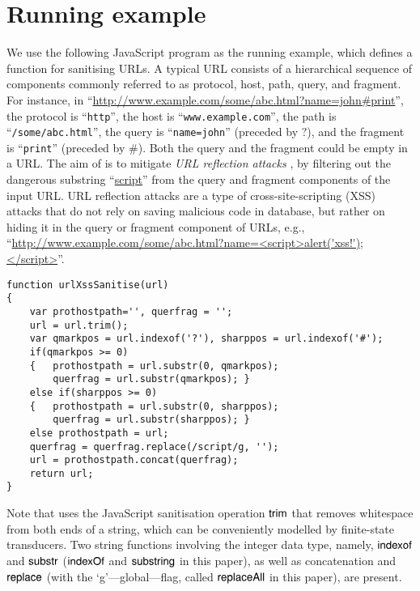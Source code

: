  
\section{Running example} \label{exmp:running}
We use the following JavaScript program as the running example,
which defines a function {\urlxsssanitise} for sanitising URLs. A typical URL consists of a hierarchical sequence of components commonly referred to as protocol, host, path, query, and fragment. For instance, in ``\url{http://www.example.com/some/abc.html?name=john#print}'', the protocol is ``{\tt http}'', the host is ``{\tt www.example.com}'', the path is ``{\tt /some/abc.html}'', the query is ``{\tt name=john}'' (preceded by $?$), and the fragment is ``{\tt print}'' (preceded by $\#$). Both the query and the fragment could be empty in a URL. The aim of {\urlxsssanitise} is to mitigate \emph{URL reflection attacks} \cite{url-reflect}, by filtering out the dangerous substring ``\url{script}'' from the query and fragment components of  the input URL. URL reflection attacks are a type of cross-site-scripting (XSS) attacks that do not rely on saving malicious code in database, but rather on hiding it in the query or fragment component of URLs, e.g., ``\url{http://www.example.com/some/abc.html?name=<script>alert('xss!');</script>}''.
{\small
\begin{verbatim}
function urlXssSanitise(url)
{
    var prothostpath='', querfrag = '';
    url = url.trim();
    var qmarkpos = url.indexof('?'), sharppos = url.indexof('#');
    if(qmarkpos >= 0) 
    {   prothostpath = url.substr(0, qmarkpos);
        querfrag = url.substr(qmarkpos); }
    else if(sharppos >= 0)
    {   prothostpath = url.substr(0, sharppos);
        querfrag = url.substr(sharppos); }
    else prothostpath = url;
    querfrag = querfrag.replace(/script/g, '');
    url = prothostpath.concat(querfrag);
    return url;
}
\end{verbatim}
}
%
\noindent Note that {\urlxsssanitise} uses the JavaScript sanitisation operation $\sf trim$ that removes whitespace from both ends of a string, which can be conveniently modelled by finite-state transducers. Two string functions involving the integer data type, namely, $\sf indexof$ and $\sf substr$ ($\mathsf{indexOf}$ and $\mathsf{substring}$ in this paper), as well as concatenation and $\sf replace$ (with the `g'---global---flag, called $\mathsf{replaceAll}$ in this paper), are present. 

